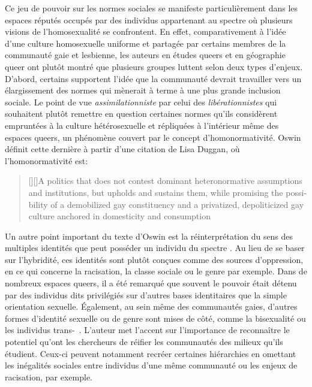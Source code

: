 Ce jeu de pouvoir sur les normes sociales se manifeste particulièrement dans les espaces réputés occupés par des individus appartenant au spectre \lgbt{} où plusieurs visions de l'homosexualité se confrontent.
En effet, comparativement à l'idée d'une culture homosexuelle uniforme et partagée par certains membres de la communauté gaie et lesbienne, les auteurs en études queers et en géographie queer ont plutôt montré que plusieurs groupes luttent selon deux types d'enjeux.
D'abord, certains supportent l'idée que la communauté devrait travailler vers un élargissement des normes qui mènerait à terme à une plus grande inclusion sociale.
Le point de vue \emph{assimilationniste} par celui des \emph{libérationnistes} qui souhaitent plutôt remettre en question certaines normes qu'ils considèrent empruntées à la culture hétérosexuelle et répliquées à l'intérieur même des espaces queers, un phénomène couvert par le concept d'homonormativité.
Oswin définit cette dernière à partir d'une citation de Lisa Duggan, où l'homonormativité est:
\foreignblockquote{english}[{\cite[tel que cité dans][92]{Oswin2008}}][]{[{\cite[50]{Duggan2003}}][]{A politics that does not contest dominant heteronormative assumptions and institutions, but upholds and sustains them, while promising the possibility of a demobilized gay constituency and a privatized, depoliticized gay culture anchored in domesticity and consumption}}.

Un autre point important du texte d'Oswin est la réinterprétation du sens des multiples identités que peut posséder un individu du spectre \lgbt{}.
Au lieu de se baser sur l'hybridité, ces identités sont plutôt conçues comme des sources d'oppression, en ce qui concerne la racisation, la classe sociale ou le genre par exemple.
Dans de nombreux espaces queers, il a été remarqué que souvent le pouvoir était détenu par des individus dits privilégiés sur d'autres bases identitaires que la simple orientation sexuelle.
Également, au sein même des communautés gaies, d'autres formes d'identité sexuelle ou de genre sont mises de côté, comme la bisexualité ou les individus trans-~\citep[93]{Oswin2008}.
L'auteur met l'accent sur l'importance de reconnaître le potentiel qu'ont les chercheurs de réifier les communautés des milieux qu'ils étudient. Ceux-ci peuvent notamment recréer certaines hiérarchies en omettant les inégalités sociales entre individus d'une même communauté ou les enjeux de racisation, par exemple.

